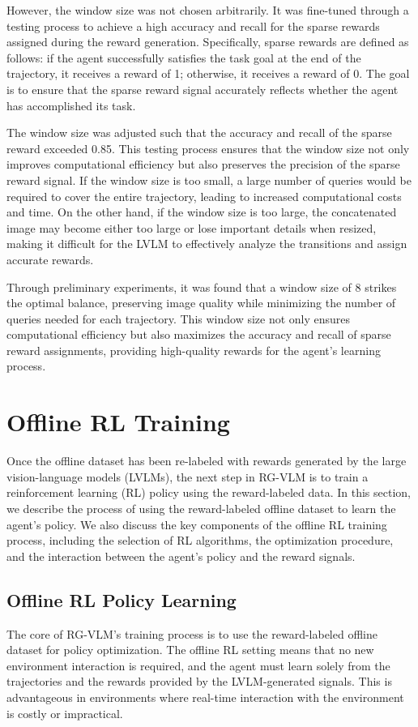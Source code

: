 \documentclass[master,english,final]{kaist-ucs}
\begin{document}
However, the window size was not chosen arbitrarily. It was fine-tuned through a testing process to achieve a high accuracy and recall for the sparse rewards assigned during the reward generation. Specifically, sparse rewards are defined as follows: if the agent successfully satisfies the task goal at the end of the trajectory, it receives a reward of 1; otherwise, it receives a reward of 0. The goal is to ensure that the sparse reward signal accurately reflects whether the agent has accomplished its task.

The window size was adjusted such that the accuracy and recall of the sparse reward exceeded 0.85. This testing process ensures that the window size not only improves computational efficiency but also preserves the precision of the sparse reward signal. If the window size is too small, a large number of queries would be required to cover the entire trajectory, leading to increased computational costs and time. On the other hand, if the window size is too large, the concatenated image may become either too large or lose important details when resized, making it difficult for the LVLM to effectively analyze the transitions and assign accurate rewards.

Through preliminary experiments, it was found that a window size of 8 strikes the optimal balance, preserving image quality while minimizing the number of queries needed for each trajectory. This window size not only ensures computational efficiency but also maximizes the accuracy and recall of sparse reward assignments, providing high-quality rewards for the agent’s learning process.

\section{Offline RL Training}
Once the offline dataset has been re-labeled with rewards generated by the large vision-language models (LVLMs), the next step in RG-VLM is to train a reinforcement learning (RL) policy using the reward-labeled data. In this section, we describe the process of using the reward-labeled offline dataset to learn the agent's policy. We also discuss the key components of the offline RL training process, including the selection of RL algorithms, the optimization procedure, and the interaction between the agent’s policy and the reward signals.

\subsection{Offline RL Policy Learning}
The core of RG-VLM's training process is to use the reward-labeled offline dataset for policy optimization. The offline RL setting means that no new environment interaction is required, and the agent must learn solely from the trajectories and the rewards provided by the LVLM-generated signals. This is advantageous in environments where real-time interaction with the environment is costly or impractical.
\end{document}
